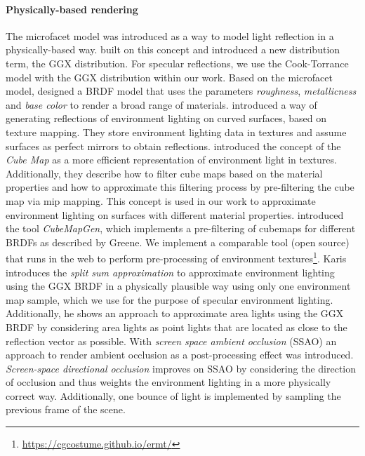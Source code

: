 \documentclass[sigconf,authorversion]{acmart}
\begin{document}
\paragraph{Physically-based rendering}
The microfacet model \cite{cook1982reflectance} was introduced as a way to model light reflection in a physically-based way.
\cite{walter2007microfacet} built on this concept and introduced a new distribution term, the GGX distribution.
For specular reflections, we use the Cook-Torrance model with the GGX distribution within our work.
Based on the microfacet model, \cite{burley2012physically} designed a BRDF model that uses the parameters \emph{roughness}, \emph{metallicness} and \emph{base color} to render a broad range of materials.
\cite{blinn1976texture} introduced a way of generating reflections of environment lighting on curved surfaces, based on texture mapping.
They store environment lighting data in textures and assume surfaces as perfect mirrors to obtain reflections.
\cite{greene1986environment} introduced the concept of the \textit{Cube Map} as a more efficient representation of environment light in textures.
Additionally, they describe how to filter cube maps based on the material properties and how to approximate this filtering process by pre-filtering the cube map via mip mapping.
This concept is used in our work to approximate environment lighting on surfaces with different material properties.
\cite{scheuermann2006cubemap} introduced the tool \textit{CubeMapGen}, which implements a pre-filtering of cubemaps for different BRDFs as described by Greene.
We implement a comparable tool (open source) that runs in the web to perform pre-processing of environment textures\footnote{\url{https://cgcostume.github.io/ermt/}}.
Karis \cite{karis2013real} introduces the \textit{split sum approximation} to approximate environment lighting using the GGX BRDF in a physically plausible way using only one environment map sample, which we use for the purpose of specular environment lighting.
Additionally, he shows an approach to approximate area lights using the GGX BRDF by considering area lights as point lights that are located as close to the reflection vector as possible.
With \textit{screen space ambient occlusion} (SSAO) \cite{mittring2007finding} an approach to render ambient occlusion as a post-processing effect was introduced.
\textit{Screen-space directional occlusion} \cite{ritschel2009approximating} improves on SSAO by considering the direction of occlusion and thus weights the environment lighting in a more physically correct way.
Additionally, one bounce of light is implemented by sampling the previous frame of the scene.
\end{document}
